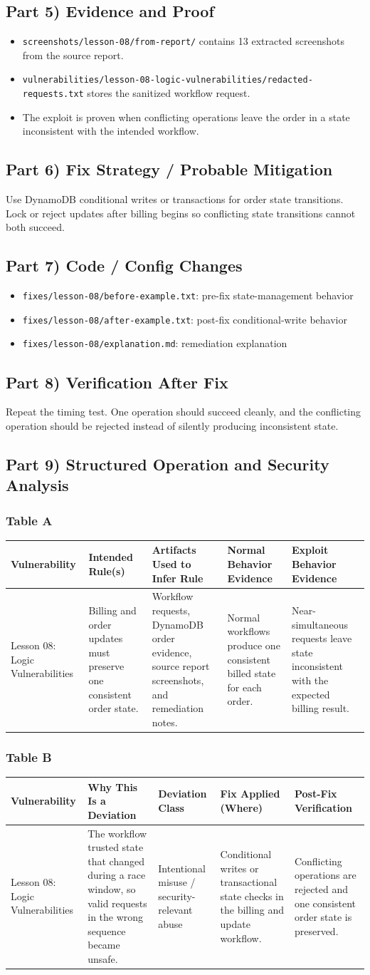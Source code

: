\documentclass[12pt]{article}
\makeatletter
\newcommand{\analysistables}[9]{
\subsubsection*{Table A}
{\footnotesize
\begin{longtable}{@{}p{0.13\textwidth}p{0.18\textwidth}p{0.17\textwidth}p{0.16\textwidth}p{0.16\textwidth}@{}}
\toprule
Vulnerability & Intended Rule(s) & Artifacts Used to Infer Rule & Normal Behavior Evidence & Exploit Behavior Evidence \\
\midrule
#1 & #2 & #3 & #4 & #5 \\
\bottomrule
\end{longtable}
}

\subsubsection*{Table B}
{\footnotesize
\begin{longtable}{@{}p{0.13\textwidth}p{0.18\textwidth}p{0.13\textwidth}p{0.18\textwidth}p{0.16\textwidth}@{}}
\toprule
Vulnerability & Why This Is a Deviation & Deviation Class & Fix Applied (Where) & Post-Fix Verification \\
\midrule
#1 & #6 & #7 & #8 & #9 \\
\bottomrule
\end{longtable}
}
}
\makeatother
\begin{document}
\subsection*{Part 5) Evidence and Proof}
\begin{itemize}
\item \texttt{screenshots/lesson-08/from-report/} contains 13 extracted screenshots from the source report.
\item \texttt{vulnerabilities/lesson-08-logic-vulnerabilities/redacted-requests.txt} stores the sanitized workflow request.
\item The exploit is proven when conflicting operations leave the order in a state inconsistent with the intended workflow.
\end{itemize}

\subsection*{Part 6) Fix Strategy / Probable Mitigation}
Use DynamoDB conditional writes or transactions for order state transitions. Lock or reject updates after billing begins so conflicting state transitions cannot both succeed.

\subsection*{Part 7) Code / Config Changes}
\begin{itemize}
\item \texttt{fixes/lesson-08/before-example.txt}: pre-fix state-management behavior
\item \texttt{fixes/lesson-08/after-example.txt}: post-fix conditional-write behavior
\item \texttt{fixes/lesson-08/explanation.md}: remediation explanation
\end{itemize}

\subsection*{Part 8) Verification After Fix}
Repeat the timing test. One operation should succeed cleanly, and the conflicting operation should be rejected instead of silently producing inconsistent state.

\subsection*{Part 9) Structured Operation and Security Analysis}
\analysistables
{Lesson 08: Logic Vulnerabilities}
{Billing and order updates must preserve one consistent order state.}
{Workflow requests, DynamoDB order evidence, source report screenshots, and remediation notes.}
{Normal workflows produce one consistent billed state for each order.}
{Near-simultaneous requests leave state inconsistent with the expected billing result.}
{The workflow trusted state that changed during a race window, so valid requests in the wrong sequence became unsafe.}
{Intentional misuse / security-relevant abuse}
{Conditional writes or transactional state checks in the billing and update workflow.}
{Conflicting operations are rejected and one consistent order state is preserved.}
\end{document}
